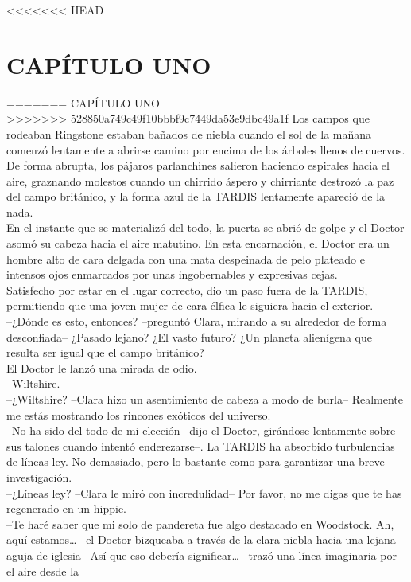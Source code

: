 <<<<<<< HEAD
\chapter*{CAPÍTULO UNO}

=======
{CAPÍTULO UNO\\
>>>>>>> 528850a749c49f10bbbf9c7449da53e9dbc49a1f
Los campos que rodeaban Ringstone estaban bañados de niebla cuando el
sol de la mañana comenzó lentamente a abrirse camino por encima de los
árboles llenos de cuervos. De forma abrupta, los pájaros parlanchines
salieron haciendo espirales hacia el aire, graznando molestos cuando un
chirrido áspero y chirriante destrozó la paz del campo británico, y la
forma azul de la TARDIS lentamente apareció de la nada.\\
En el instante que se materializó del todo, la puerta se abrió de golpe
y el Doctor asomó su cabeza hacia el aire matutino. En esta encarnación,
el Doctor era un hombre alto de cara delgada con una mata despeinada de
pelo plateado e intensos ojos enmarcados por unas ingobernables y
expresivas cejas.\\
Satisfecho por estar en el lugar correcto, dio un paso fuera de la
TARDIS, permitiendo que una joven mujer de cara élfica le siguiera hacia
el exterior.\\
--¿Dónde es esto, entonces? --preguntó Clara, mirando a su alrededor de
forma desconfiada-- ¿Pasado lejano? ¿El vasto futuro? ¿Un planeta
alienígena que resulta ser igual que el campo británico?\\
El Doctor le lanzó una mirada de odio.\\
--Wiltshire.\\
--¿Wiltshire? --Clara hizo un asentimiento de cabeza a modo de burla--
Realmente me estás mostrando los rincones exóticos del universo.\\
--No ha sido del todo de mi elección --dijo el Doctor, girándose
lentamente sobre sus talones cuando intentó enderezarse--. La TARDIS ha
absorbido turbulencias de líneas ley. No demasiado, pero lo bastante
como para garantizar una breve investigación.\\
--¿Líneas ley? --Clara le miró con incredulidad-- Por favor, no me digas
que te has regenerado en un hippie.\\
--Te haré saber que mi solo de pandereta fue algo destacado en
Woodstock. Ah, aquí estamos\ldots{} --el Doctor bizqueaba a través de la
clara niebla hacia una lejana aguja de iglesia-- Así que eso debería
significar\ldots{} --trazó una línea imaginaria por el aire desde la
}
